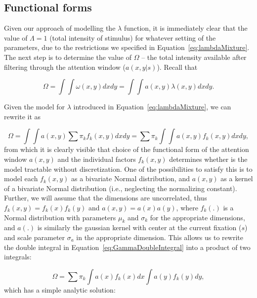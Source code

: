 \documentclass{article}
\begin{document}
\subsection{Functional forms}

Given our approach of modelling the $\lambda$ function, it is immediately clear that the value of $\Lambda = 1$ (total intensity of stimulus) for whatever setting of the parameters, due to the restrictions we specified in Equation~\ref{eq:lambdaMixture}. The next step is to determine the value of $\Omega$ -- the total intensity available after filtering through the attention window ($a(x, y |
s)$). Recall that 

\begin{equation}
    \Omega = \int \int \omega(x, y) dx dy=  \int \int a(x, y) \lambda(x, y)dx dy.
\end{equation}

Given the model for $\lambda$ introduced in Equation~\ref{eq:lambdaMixture}, we can rewrite it as

\begin{equation}
\label{eq:GammaDoubleIntegral}
    \Omega = \int \int a(x, y) \sum \pi_k f_k(x, y) dx dy = \sum \pi_k \int \int a(x, y) f_k(x, y) dx dy,
\end{equation}
from which it is clearly visible that choice of the functional form of the attention window $a(x, y)$ and the individual factors $f_k(x, y)$ determines whether is the model tractable without discretization. One of the possibilities to satisfy this is to model each $f_k(x, y)$ as a bivariate Normal distribution, and $a(x, y)$ as a kernel of a bivariate Normal distribution (i.e., neglecting the normalizing constant). Further, we will assume that the dimensions are uncorrelated, thus $f_k(x, y) = f_k(x)f_k(y)$ and $a(x, y) = a(x)a(y)$, where $f_k(.)$ is a Normal distribution with parameters $\mu_k$ and $\sigma_k$ for the appropriate dimensions, and $a(.)$ is similarly the gaussian kernel with center at the current fixation ($s$) and scale parameter $\sigma_a$ in the appropriate dimension. This allows us to rewrite the double integral in Equation~\ref{eq:GammaDoubleIntegral} into a product of two integrals:

\begin{equation}
    \Omega =  \sum \pi_k \int a(x)f_k(x) dx \int a(y)f_k(y) dy, 
\end{equation}
which has a simple analytic solution:
\end{document}
